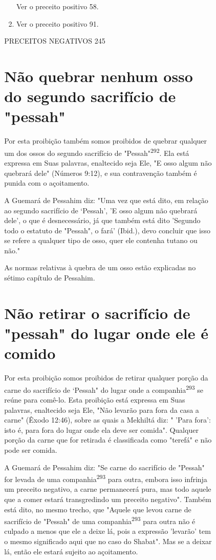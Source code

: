\begin{itemize}
\begin{enumrate}
\begin{itemize}
\begin{itemize}
\begin{itemize}
\begin{enumerate}
 Ver o preceito positivo 58.
 
\item
 
 Ver o preceito positivo 91.
 
\end{enumerate}


PRECEITOS NEGATIVOS 245

\section{Não quebrar nenhum osso do segundo sacrifício de "pessah"}

Por esta proibição também somos proibidos de quebrar qualquer um dos
ossos do segundo sacrifício de "Pessah"\textsuperscript{292}. Ela está
expressa em Suas pa­lavras, enaltecido seja Ele, "E osso algum não
quebrará dele" (Números 9:12), e sua contravenção também é punida com o
açoitamento.

A Guemará de Pessahim diz: "Uma vez que está dito, em relação ao segundo
sacrifício de `Pessah', 'E osso algum não quebrará dele', o que é
des­necessário, já que também está dito 'Segundo todo o estatuto de
"Pessah", o fará' (Ibid.), devo concluir que isso se refere a qualquer
tipo de osso, quer ele contenha tutano ou não."

As normas relativas à quebra de um osso estão explicadas no sétimo
capítulo de Pessahim.

\section{Não retirar o sacrifício de "pessah" do lugar onde ele é comido}

Por esta proibição somos proibidos de retirar qualquer porção da car­ne
do sacrifício de `Pessah" do lugar onde a companhia\textsuperscript{293}
se reúne para comê-lo. Esta proibição está expressa em Suas palavras,
enaltecido seja Ele, "Não leva­rão para fora da casa a carne" (Êxodo
12:46), sobre as quais a Mekhiltá diz: " 'Pa­ra fora': isto é, para fora
do lugar onde ela deve ser comida". Qualquer porção da carne que for
retirada é classificada como "terefá" e não pode ser comida.

A Guemará de Pessahim diz: "Se carne do sacrifício de "Pessah" for
levada de uma companhia\textsuperscript{293} para outra, embora isso
infrinja um preceito ne­gativo, a carne permanecerá pura, mas todo
aquele que a comer estará trans­gredindo um preceito negativo". Também
está dito, no mesmo trecho, que "Aquele que levou carne de sacrifício de
"Pessah" de uma companhia\textsuperscript{293} para outra não é culpado
a menos que ele a deixe lá, pois a expressão 'levarão' tem o mesmo
significado aqui que no caso do Shabat". Mas se a deixar lá, então ele
estará sujeito ao açoitamento.



\end{itemize}
\end{itemize}
\end{itemize}
\end{enumrate}
\end{itemize}

